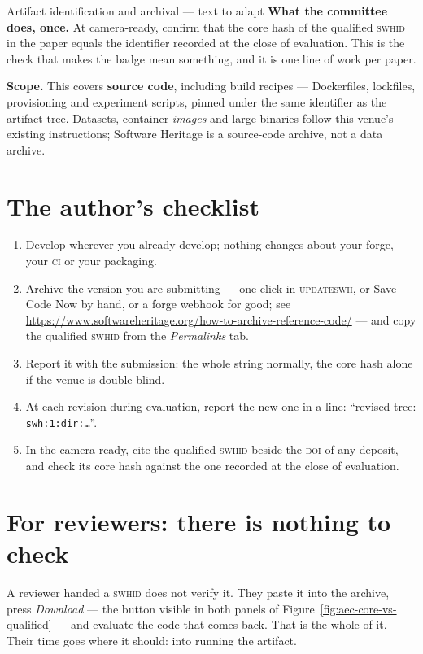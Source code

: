 \begin{callout}{Artifact identification and archival --- text to adapt}
\smallskip
\textbf{What the committee does, once.} At camera-ready, confirm that the core hash of the
qualified \textsc{swhid} in the paper equals the identifier recorded at the close of evaluation.
This is the check that makes the badge mean something, and it is one line of work per paper.

\smallskip
\textbf{Scope.} This covers \textbf{source code}, including build recipes --- Dockerfiles,
lockfiles, provisioning and experiment scripts, pinned under the same identifier as the artifact
tree. Datasets, container \emph{images} and large binaries follow this venue's existing
instructions; Software Heritage is a source-code archive, not a data archive.
\end{callout}

\section{The author's checklist}

\begin{enumerate}[nosep,leftmargin=*]
  \item Develop wherever you already develop; nothing changes about your forge, your \textsc{ci}
        or your packaging.
  \item Archive the version you are submitting --- one click in \textsc{updateswh}, or Save Code
        Now by hand, or a forge webhook for good; see
        \url{https://www.softwareheritage.org/how-to-archive-reference-code/} --- and copy the
        qualified \textsc{swhid} from the \emph{Permalinks} tab.
  \item Report it with the submission: the whole string normally, the core hash alone if the
        venue is double-blind.
  \item At each revision during evaluation, report the new one in a line:
        \enquote{revised tree: \texttt{swh:1:dir:\dots}}.
  \item In the camera-ready, cite the qualified \textsc{swhid} beside the \textsc{doi} of any
        deposit, and check its core hash against the one recorded at the close of evaluation.
\end{enumerate}

\section{For reviewers: there is nothing to check}
\label{sec:aec-reviewers}

A reviewer handed a \textsc{swhid} does not verify it. They paste it into the archive, press
\emph{Download} --- the button visible in both panels of
Figure~\ref{fig:aec-core-vs-qualified} --- and evaluate the code that comes back. That is the
whole of it. Their time goes where it should: into running the artifact.

